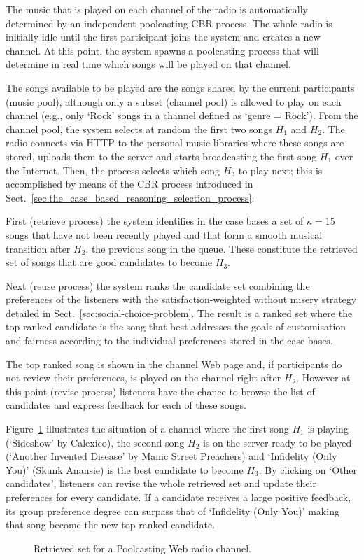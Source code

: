 The music that is played on each channel of the radio is automatically determined by an independent poolcasting CBR process.
The whole radio is initially idle until the first participant joins the system and creates a new channel. At this point, the system spawns a poolcasting process that will determine in real time which songs will be played on that channel.

The songs available to be played are the songs shared by the current participants (music pool), although only a subset %
(channel pool) is allowed to play on each channel (e.g., only `Rock' songs in a channel defined as `genre = Rock').
%
From the channel pool, the system selects at random the first two songs $H_1$ and $H_2$.
The radio connects via HTTP to the personal music libraries where these songs are stored, uploads them to the server and starts broadcasting the first song $H_1$ over the Internet.
Then, the process selects which song $H_3$ to play next; this is accomplished by means of the CBR process introduced in Sect.~\ref{sec:the_case_based_reasoning_selection_process}.

First (retrieve process) the system identifies in the case bases a set of $\kappa = 15$ songs that have not been recently played and that form a smooth musical transition after $H_2$, the previous song in the queue.
These constitute the retrieved set of songs that are good candidates to become $H_3$.

Next (reuse process) the system ranks the candidate set combining the preferences of the listeners with the satisfaction-weighted without misery strategy detailed in Sect.~\ref{sec:social-choice-problem}.
The result is a ranked set where the top ranked candidate is the song that best addresses the goals of customisation and fairness according to the individual preferences stored in the case bases.

The top ranked song is shown in the channel Web page and, if participants do not review their preferences, is played on the channel right after $H_2$.
However at this point (revise process) listeners have the chance to browse the list of candidates and express feedback for each of these songs.

Figure~\ref{fig:pwr_candidates} illustrates the situation of a channel where the first song $H_1$ is playing (`Sideshow' by Calexico), the second song $H_2$ is on the server ready to be played (`Another Invented Disease' by Manic Street Preachers) and `Infidelity (Only You)' (Skunk Anansie) is the best candidate to become $H_3$.
By clicking on `Other candidates', listeners can revise the whole retrieved set and update their preferences for every candidate. 
If a candidate receives a large positive feedback, its group preference degree can surpass that of `Infidelity (Only You)' making that song become the new top ranked candidate.
%
\begin{figure}[tbhp]
\centering \setlength{\abovecaptionskip}{3pt}
\caption{Retrieved set for a Poolcasting Web radio channel.}
\label{fig:pwr_candidates}
\end{figure}

